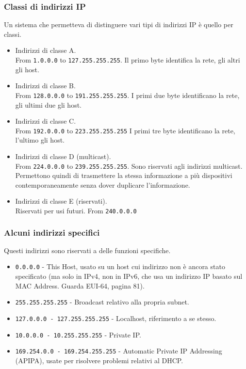 \subsubsection{Classi di indirizzi IP}
Un sistema che permetteva di distinguere vari tipi di indirizzi IP è quello per classi.
\begin{itemize}
	\item Indirizzi di classe A.\\
	From \verb|1.0.0.0| to \verb|127.255.255.255|.
	Il primo byte identifica la rete, gli altri gli host.
	\item Indirizzi di classe B.\\
	From \verb|128.0.0.0| to \verb|191.255.255.255|.
	I primi due byte identificano la rete, gli ultimi due gli host.
	\item Indirizzi di classe C.\\
	From \verb|192.0.0.0| to \verb|223.255.255.255|
	I primi tre byte identificano la rete, l'ultimo gli host.
	\item Indirizzi di classe D (multicast).\\
	From \verb|224.0.0.0| to \verb|239.255.255.255|. Sono riservati agli indirizzi multicast. Permettono quindi di trasmettere la stessa informazione a più dispositivi contemporaneamente senza dover duplicare l'informazione.
	\item Indirizzi di classe E (riservati).\\
	Riservati per usi futuri.
	From \verb|240.0.0.0|
\end{itemize}

\subsubsection{Alcuni indirizzi specifici}
Questi indirizzi sono riservati a delle funzioni specifiche.
\begin{itemize}
	\item \verb|0.0.0.0| - This Host, usato su un host cui indirizzo non è ancora stato specificato (ma solo in IPv4, non in IPv6, che usa un indirizzo IP basato sul MAC Address. Guarda EUI-64, pagina 81).
	\item \verb|255.255.255.255| - Broadcast relativo alla propria subnet.
	\item \verb|127.0.0.0 - 127.255.255.255| - Localhost, riferimento a se stesso.
	\item \verb|10.0.0.0 - 10.255.255.255| - Private IP.
	\item \verb|169.254.0.0 - 169.254.255.255| - Automatic Private IP Addressing (APIPA), usate per risolvere problemi relativi al DHCP.
\end{itemize}

